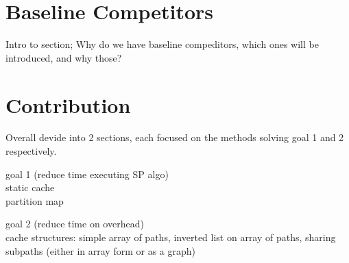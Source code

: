 \section{Baseline Competitors}

Intro to section; Why do we have baseline compeditors, which ones will be introduced, and why those? 

\section{Contribution} \label{sec:contribution}

Overall devide into 2 sections, each focused on the methods solving goal 1 and 2 respectively. 

goal 1 (reduce time executing SP algo) \\
static cache \\
partition map \\ \newline


goal 2 (reduce time on overhead)\\
cache structures: simple array of paths, inverted list on array of paths, sharing subpaths (either in array form or as a graph)\\

